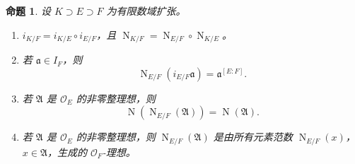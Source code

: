 \documentclass[11pt,a4paper,openany]{ctexbook}
\numberwithin{equation}{chapter}
\newcommand{\OF}{\mathcal{O}_F}
\newcommand{\Nm}{\operatorname{N}}
\theoremstyle{plain}
\newtheorem{proposition}[theorem]{命题}
\theoremstyle{definition}
\theoremstyle{remark}
\begin{document}
\begin{proposition}
设 $K\supset E\supset F$ 为有限数域扩张。
\begin{enumerate}[label=(\arabic*)]
\item $i_{K/F}=i_{K/E}\circ i_{E/F}$，且 $\Nm_{K/F}=\Nm_{E/F}\circ\Nm_{K/E}$。
\item 若 $\mathfrak a\in I_F$，则
\[
\Nm_{E/F}(i_{E/F}\mathfrak a)=\mathfrak a^{[E:F]}.
\]
\item 若 $\mathfrak A$ 是 $\mathcal O_E$ 的非零整理想，则
\[
\Nm(\Nm_{E/F}(\mathfrak A))=\Nm(\mathfrak A).
\]
\item 若 $\mathfrak A$ 是 $\mathcal O_E$ 的非零整理想，则 $\Nm_{E/F}(\mathfrak A)$ 是由所有元素范数 $\Nm_{E/F}(x)$，$x\in\mathfrak A$，生成的 $\OF$-理想。
\end{enumerate}
\end{proposition}
\end{document}
